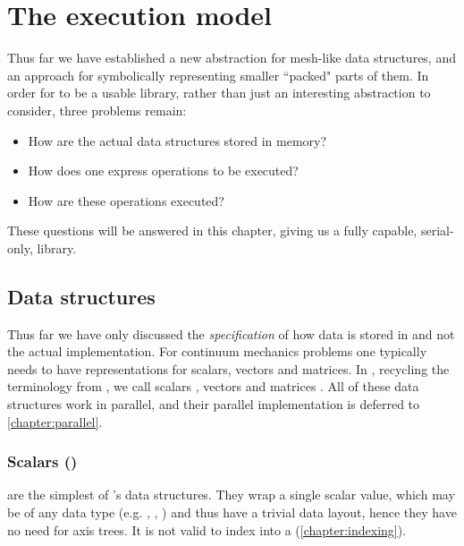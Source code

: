\documentclass[thesis]{subfiles}
\begin{document}
\chapter{The execution model}
\label{chapter:execution_model}


Thus far we have established a new abstraction for mesh-like data structures, and an approach for symbolically representing smaller ``packed" parts of them.
In order for  to be a usable library, rather than just an interesting abstraction to consider, three problems remain:

\begin{itemize}
  \item How are the actual data structures stored in memory?
  \item How does one express operations to be executed?
  \item How are these operations executed?
\end{itemize}

These questions will be answered in this chapter, giving us a fully capable, serial-only,  library.

\section{Data structures}
\label{sec:data_structures}

Thus far we have only discussed the \textit{specification} of how data is stored in  and not the actual implementation.
For continuum mechanics problems one typically needs to have representations for scalars, vectors and matrices.
In , recycling the terminology from , we call scalars , vectors  and matrices .
All of these data structures work in parallel, and their parallel implementation is deferred to \cref{chapter:parallel}.

\subsection{Scalars ()}

 are the simplest of 's data structures.
They wrap a single scalar value, which may be of any data type (e.g. , , ) and thus have a trivial data layout, hence they have no need for axis trees.
It is not valid to index into a  (\cref{chapter:indexing}).
\end{document}
